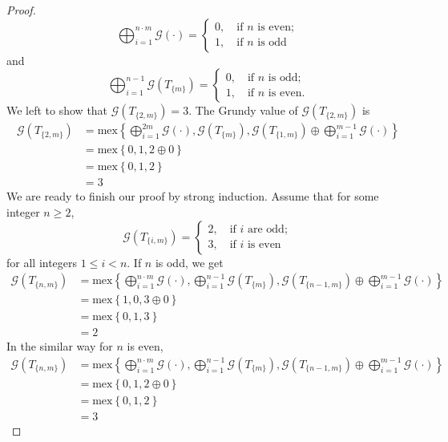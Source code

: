 \documentclass[10pt,a4paper]{amsart}
\begin{document}
\begin{proof}
\begin{equation*}
			\bigoplus_{i=1}^{n\cdot m}\mathcal{G}\left(\cdot\right) = \begin{cases}
				0,	\quad \text{if $n$ is even};\\
				1,	\quad \text{if $n$ is odd}
			\end{cases}
	\end{equation*}
	and
	\begin{equation*}
		\bigoplus_{i=1}^{n-1}\mathcal{G}\left(T_{\{m\}}\right) = \begin{cases}
			0,	\quad \text{if $n$ is odd};\\
			1,	\quad \text{if $n$ is even}.
		\end{cases}
	\end{equation*}
	We left to show that $\mathcal{G}\left(T_{\{2,m\}}\right) =  3$. The Grundy value of $\mathcal{G}\left(T_{\{2,m\}}\right)$ is
	\begin{align*}
		\mathcal{G}\left(T_{\{2,m\}}\right) &= \mathrm{mex}\left\{\bigoplus_{i=1}^{2 m}\mathcal{G}\left(\cdot\right), \mathcal{G}\left(T_{\{m\}}\right), \mathcal{G}\left(T_{\{1,m\}}\right) \oplus \bigoplus_{i=1}^{m-1}\mathcal{G}\left(\cdot\right)\right\}\\
		&= \mathrm{mex}\left\{0, 1, 2 \oplus 0\right\}\\
		&= \mathrm{mex}\left\{0, 1, 2 \right\}\\
		&= 3
	\end{align*}
	We are ready to finish our proof by strong induction. Assume that for some integer $n \ge 2$, 
	\begin{equation*}
		\mathcal{G}\left(T_{\{i,m\}}\right) = \begin{cases}
			2,	\quad \text{if $i$ are odd};\\
			3,	\quad \text{if $i$ is even}
		\end{cases}
	\end{equation*}
	for all integers $1 \le i < n$. If $n$ is odd, we get
	\begin{align*}
		\mathcal{G}\left(T_{\{n,m\}}\right) &= \mathrm{mex}\left\{\bigoplus_{i=1}^{n\cdot m}\mathcal{G}\left(\cdot\right), \bigoplus_{i=1}^{n-1}\mathcal{G}\left(T_{\{m\}}\right), \mathcal{G}\left(T_{\{n-1,m\}}\right) \oplus \bigoplus_{i=1}^{m-1}\mathcal{G}\left(\cdot\right)\right\}\\
		&= \mathrm{mex}\left\{1,0,3 \oplus 0\right\}\\
		&= \mathrm{mex}\left\{0,1,3\right\}\\
		&= 2
	\end{align*}
	In the similar way for $n$ is even,
	\begin{align*}
		\mathcal{G}\left(T_{\{n,m\}}\right) &= \mathrm{mex}\left\{\bigoplus_{i=1}^{n\cdot m}\mathcal{G}\left(\cdot\right), \bigoplus_{i=1}^{n-1}\mathcal{G}\left(T_{\{m\}}\right), \mathcal{G}\left(T_{\{n-1,m\}}\right) \oplus \bigoplus_{i=1}^{m-1}\mathcal{G}\left(\cdot\right)\right\}\\
		&= \mathrm{mex}\left\{0,1,2 \oplus 0\right\}\\
		&= \mathrm{mex}\left\{0,1,2\right\}\\
		&= 3
	\end{align*}
\end{proof}
\end{document}
